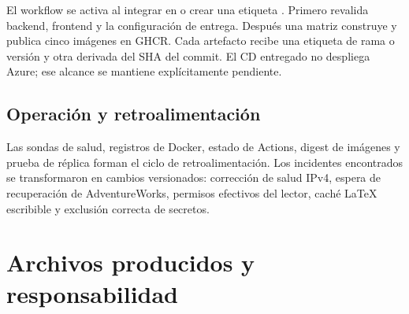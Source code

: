 El workflow  se activa al integrar en  o crear una etiqueta . Primero revalida backend, frontend y la configuración de entrega. Después una matriz construye y publica cinco imágenes en GHCR. Cada artefacto recibe una etiqueta de rama o versión y otra derivada del SHA del commit. El CD entregado no despliega Azure; ese alcance se mantiene explícitamente pendiente.

\subsection{Operación y retroalimentación}

Las sondas de salud, registros de Docker, estado de Actions, digest de imágenes y prueba de réplica forman el ciclo de retroalimentación. Los incidentes encontrados se transformaron en cambios versionados: corrección de salud IPv4, espera de recuperación de AdventureWorks, permisos efectivos del lector, caché LaTeX escribible y exclusión correcta de secretos.

\section{Archivos producidos y responsabilidad}

